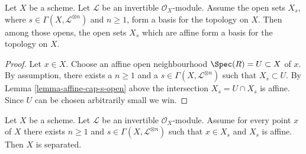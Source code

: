 \begin{lemma}
\label{lemma-affine-s-opens}
Let $X$ be a scheme. Let $\mathcal{L}$ be an invertible $\mathcal{O}_X$-module.
Assume the open sets $X_s$, where $s \in \Gamma(X, \mathcal{L}^{\otimes n})$
and $n \geq 1$, form a basis for the topology on $X$.
Then among those opens, the open sets $X_s$ which are affine
form a basis for the topology on $X$.
\end{lemma}

\begin{proof}
Let $x \in X$. Choose an affine open neighbourhood
$\Spec(R) = U \subset X$ of $x$.
By assumption, there exists
a $n \geq 1$ and a $s \in \Gamma(X, \mathcal{L}^{\otimes n})$
such that $X_s \subset U$. By Lemma \ref{lemma-affine-cap-s-open} above
the intersection $X_s = U \cap X_s$ is affine.
Since $U$ can be chosen arbitrarily small we win.
\end{proof}

\begin{lemma}
\label{lemma-affine-s-opens-cover-quasi-separated}
Let $X$ be a scheme. Let $\mathcal{L}$ be an invertible $\mathcal{O}_X$-module.
Assume for every point $x$ of $X$ there exists $n \geq 1$ and
$s \in \Gamma(X, \mathcal{L}^{\otimes n})$ such that
$x \in X_s$ and $X_s$ is affine. Then $X$ is separated.
\end{lemma}

